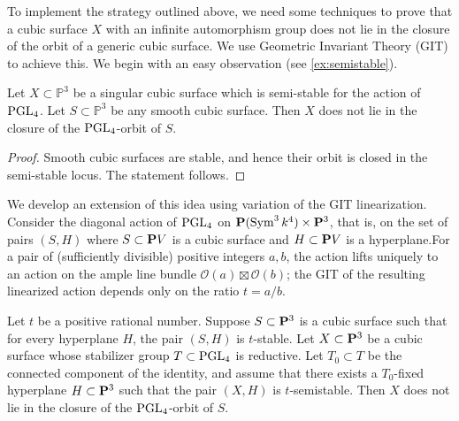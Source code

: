 \documentclass[12pt,reqno]{amsart}
\renewcommand{\k}{k}
\numberwithin{equation}{section}
\begin{document}
To implement the strategy outlined above, we need some techniques to prove that a cubic surface $X$ with an infinite automorphism group does not lie in the closure of the orbit of a generic cubic surface.
We use Geometric Invariant Theory (GIT) to achieve this.
We begin with an easy observation (see \autoref{ex:semistable}).
\begin{proposition}
  Let $X \subset \mathbb P^3$ be a singular cubic surface which is semi-stable for the action of $\PGL_4$.
  Let $S \subset \mathbb P^3$ be any smooth cubic surface.
  Then $X$ does not lie in the closure of the $\PGL_4$-orbit of $S$.
\end{proposition}
\begin{proof}
  Smooth cubic surfaces are stable, and hence their orbit is closed in the semi-stable locus.  The statement follows.
\end{proof}

We develop an extension of this idea using variation of the GIT linearization.
Consider the diagonal action
of $\PGL_4$ on $\P(\Sym^3 \k^4) \times \P^3$, that is, on the set of pairs $(S, H)$ where $S \subset \P V$ is a cubic surface and $H \subset \P V$ is a hyperplane.For a pair of (sufficiently divisible) positive integers $a, b$, the action lifts uniquely to an action on the ample
line bundle $\mathcal O(a)\boxtimes \mathcal O(b)$; the GIT of the
resulting linearized action depends only on the ratio $t = a/b$.

\begin{proposition}\label{prop:nolimit}
  Let $t$ be a positive rational number.
  Suppose $S \subset \P^3$ is a cubic surface such that for every hyperplane $H$, the pair $(S,H)$ is $t$-stable.
  Let $X \subset \P^3$ be a cubic surface whose stabilizer group $T \subset \PGL_4$ is reductive.
  Let $T_0 \subset T$ be the connected component of the identity, and assume that there exists a $T_0$-fixed hyperplane $H \subset \P^3$ such that the pair $(X, H)$ is $t$-semistable.
  Then $X$ does not lie in the closure of the $\PGL_4$-orbit of $S$.
\end{proposition}
\end{document}
